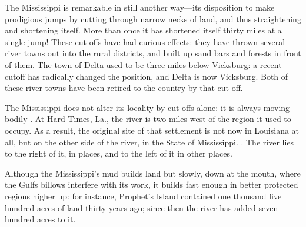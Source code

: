 \documentclass[../../../demo.tex]{novelettesubdoc}
\begin{document}
The Mississippi is remarkable in still another way---its disposition to
make prodigious jumps by cutting through narrow necks of land, and thus
straightening and shortening itself. More than once it has shortened
itself thirty miles at a single jump! These cut-offs have had curious
effects: they have thrown several river towns out into the rural
districts, and built up sand bars and forests in front of them. The town
of Delta used to be three miles below Vicksburg: a recent cutoff has
radically changed the position, and Delta is now 
Vicksburg. Both of these river towns have been retired to the country by that
cut-off.

The Mississippi does not alter its locality by cut-offs alone: it
is always 
moving bodily . At Hard Times, La., the river is two miles west
of the region it used to occupy. As a result, the original site of that
settlement is not now in Louisiana at all, but on the other side of
the river, in the State of Mississippi. . The river lies to the right of it, in places, and to the
left of it in other places.

Although the Mississippi's mud builds land but slowly, down at the
mouth, where the Gulfs billows interfere with its work, it builds fast
enough in better protected regions higher up: for instance, Prophet's
Island contained one thousand five hundred acres of land thirty years
ago; since then the river has added seven hundred acres to it.
\end{document}
